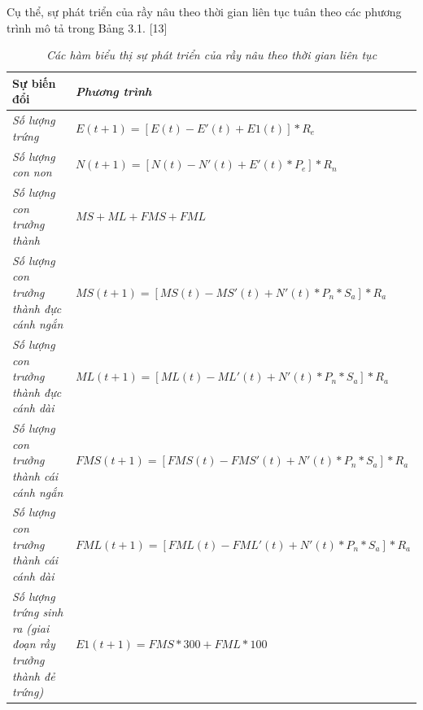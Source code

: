 \documentclass[13pt]{extreport}
\begin{document}
Cụ thể, sự phát triển của rầy nâu theo thời gian liên tục tuân theo các phương trình mô tả trong Bảng 3.1. [13]
\begin{table}
\begin{tabular}{m{7cm} m{8cm}}
\hline
{Sự biến đổi} & \textit{Phương trình} \\ 
\hline
\textit{Số lượng trứng} & $E(t+1) = [E(t)-E'(t)+E1(t)]*R_e$ \\ 
\hline
\textit{Số lượng con non} & $N(t+1)=[N(t)-N'(t)+E'(t)*P_e]*R_n$ \\ 
\hline
\textit{Số lượng con trưởng thành} & $MS+ML+FMS+FML$ \\
\hline
\textit{Số lượng con trưởng thành đực cánh ngắn} & $MS(t+1)=[MS(t)-MS'(t)+N'(t)*P_n*S_a]*R_a$ \\
\hline
\textit{Số lượng con trưởng thành đực cánh dài} & $ML(t+1)=[ML(t)-ML'(t)+N'(t)*P_n*S_a]*R_a$ \\
\hline
\textit{Số lượng con trưởng thành cái cánh ngắn} & $FMS(t+1)=[FMS(t)-FMS'(t)+N'(t)*P_n*S_a]*R_a$ \\
\hline
\textit{Số lượng con trưởng thành cái cánh dài} & $FML(t+1)=[FML(t)-FML'(t)+N'(t)*P_n*S_a]*R_a$ \\
\hline
\textit{Số lượng trứng sinh ra (giai đoạn rầy trưởng thành đẻ trứng)} & $E1(t+1)=FMS*300+FML*100$ \\
\hline
\end{tabular}
\caption{\textit{Các hàm biểu thị sự phát triển của rầy nâu theo thời gian liên tục}}
\end{table}
 
\end{document}
